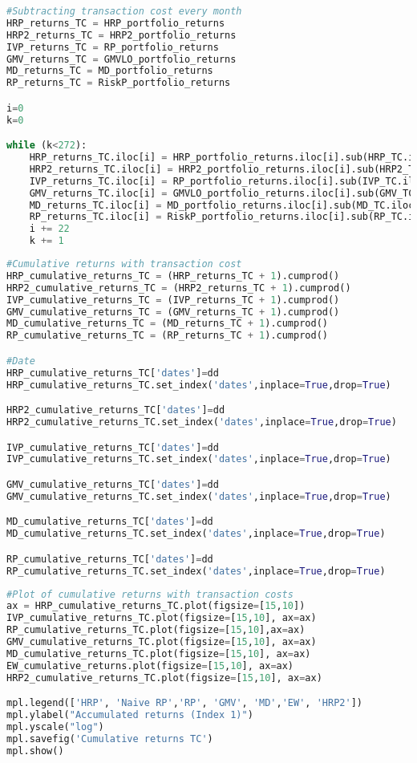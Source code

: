 \begin{lstlisting}[language=Python]
#Subtracting transaction cost every month
HRP_returns_TC = HRP_portfolio_returns
HRP2_returns_TC = HRP2_portfolio_returns
IVP_returns_TC = RP_portfolio_returns
GMV_returns_TC = GMVLO_portfolio_returns
MD_returns_TC = MD_portfolio_returns
RP_returns_TC = RiskP_portfolio_returns

i=0
k=0

while (k<272):
    HRP_returns_TC.iloc[i] = HRP_portfolio_returns.iloc[i].sub(HRP_TC.iloc[k])
    HRP2_returns_TC.iloc[i] = HRP2_portfolio_returns.iloc[i].sub(HRP2_TC.iloc[k])
    IVP_returns_TC.iloc[i] = RP_portfolio_returns.iloc[i].sub(IVP_TC.iloc[k])
    GMV_returns_TC.iloc[i] = GMVLO_portfolio_returns.iloc[i].sub(GMV_TC.iloc[k])
    MD_returns_TC.iloc[i] = MD_portfolio_returns.iloc[i].sub(MD_TC.iloc[k])
    RP_returns_TC.iloc[i] = RiskP_portfolio_returns.iloc[i].sub(RP_TC.iloc[k])
    i += 22
    k += 1
\end{lstlisting}

\begin{lstlisting}[language=Python]
#Cumulative returns with transaction cost
HRP_cumulative_returns_TC = (HRP_returns_TC + 1).cumprod()
HRP2_cumulative_returns_TC = (HRP2_returns_TC + 1).cumprod()
IVP_cumulative_returns_TC = (IVP_returns_TC + 1).cumprod()
GMV_cumulative_returns_TC = (GMV_returns_TC + 1).cumprod()
MD_cumulative_returns_TC = (MD_returns_TC + 1).cumprod()
RP_cumulative_returns_TC = (RP_returns_TC + 1).cumprod()

#Date
HRP_cumulative_returns_TC['dates']=dd
HRP_cumulative_returns_TC.set_index('dates',inplace=True,drop=True)

HRP2_cumulative_returns_TC['dates']=dd
HRP2_cumulative_returns_TC.set_index('dates',inplace=True,drop=True)

IVP_cumulative_returns_TC['dates']=dd
IVP_cumulative_returns_TC.set_index('dates',inplace=True,drop=True)

GMV_cumulative_returns_TC['dates']=dd
GMV_cumulative_returns_TC.set_index('dates',inplace=True,drop=True)

MD_cumulative_returns_TC['dates']=dd
MD_cumulative_returns_TC.set_index('dates',inplace=True,drop=True)

RP_cumulative_returns_TC['dates']=dd
RP_cumulative_returns_TC.set_index('dates',inplace=True,drop=True)
\end{lstlisting}

\begin{lstlisting}[language=Python]
#Plot of cumulative returns with transaction costs
ax = HRP_cumulative_returns_TC.plot(figsize=[15,10])
IVP_cumulative_returns_TC.plot(figsize=[15,10], ax=ax)
RP_cumulative_returns_TC.plot(figsize=[15,10],ax=ax)
GMV_cumulative_returns_TC.plot(figsize=[15,10], ax=ax)
MD_cumulative_returns_TC.plot(figsize=[15,10], ax=ax)
EW_cumulative_returns.plot(figsize=[15,10], ax=ax)
HRP2_cumulative_returns_TC.plot(figsize=[15,10], ax=ax)

mpl.legend(['HRP', 'Naive RP','RP', 'GMV', 'MD','EW', 'HRP2'])
mpl.ylabel("Accumulated returns (Index 1)")
mpl.yscale("log")
mpl.savefig('Cumulative returns TC')
mpl.show()
\end{lstlisting}

